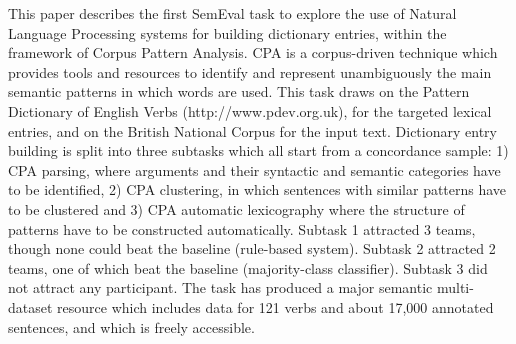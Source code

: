 This paper describes the first SemEval task to explore the use of Natural Language Processing systems for building dictionary entries, within the framework of Corpus Pattern Analysis. CPA is a corpus-driven technique which provides tools and resources to identify and represent unambiguously the main semantic patterns in which words are used. This task draws on the Pattern Dictionary of English Verbs (http://www.pdev.org.uk), for the targeted lexical entries, and on the British National Corpus for the input text. Dictionary entry building is split into three subtasks which all start from a concordance sample: 1) CPA parsing, where arguments and their syntactic and semantic categories have to be identified, 2) CPA clustering, in which sentences with similar patterns have to be clustered and 3) CPA automatic lexicography where the structure of patterns have to be constructed automatically. Subtask 1 attracted 3 teams, though none could beat the baseline (rule-based system). Subtask 2 attracted 2 teams, one of which beat the baseline (majority-class classifier).  Subtask 3 did not attract any participant. The task has produced a major semantic multi-dataset resource which includes data for 121 verbs and about 17,000 annotated sentences, and which is freely accessible.
